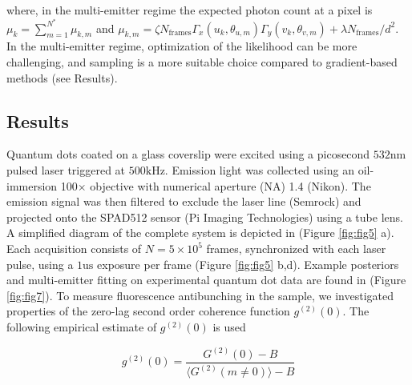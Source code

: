 
where, in the multi-emitter regime the expected photon count at a pixel is $\mu_{k} = \sum_{m=1}^{N^{*}} \mu_{k,m}$ and $\mu_{k,m}=\zeta N_{\mathrm{frames}}\Gamma_{x}(u_k,\theta_{u,m})\Gamma_{y}(v_k,\theta_{v,m}) + \lambda N_{\mathrm{frames}}/d^{2}$. In the multi-emitter regime, optimization of the likelihood can be more challenging, and sampling is a more suitable choice compared to gradient-based methods (see Results). 


\subsection{Results}

Quantum dots coated on a glass coverslip were excited using a picosecond $532\mathrm{nm}$ pulsed laser triggered at $500\mathrm{kHz}$. Emission light was collected using an oil-immersion 100$\times$ objective with numerical aperture (NA) 1.4 (Nikon). The emission signal was then filtered to exclude the laser line (Semrock) and projected onto the SPAD512 sensor (Pi Imaging Technologies) using a tube lens. A simplified diagram of the complete system is depicted in (Figure \ref{fig:fig5} a). Each acquisition consists of $N=5\times 10^{5}$ frames, synchronized with each laser pulse, using a $1\mathrm{us}$ exposure per frame (Figure \ref{fig:fig5} b,d). Example posteriors and multi-emitter fitting on experimental quantum dot data are found in (Figure \ref{fig:fig7}). To measure fluorescence antibunching in the sample, we investigated properties of the zero-lag second order coherence function $g^{(2)}(0)$. The following empirical estimate of $g^{(2)}(0)$ is used \parencite{Israel2017}

\begin{equation}
g^{(2)}(0) = \frac{G^{(2)}(0)-B}{\langle G^{(2)}(m\neq 0)\rangle -B}
\end{equation}

